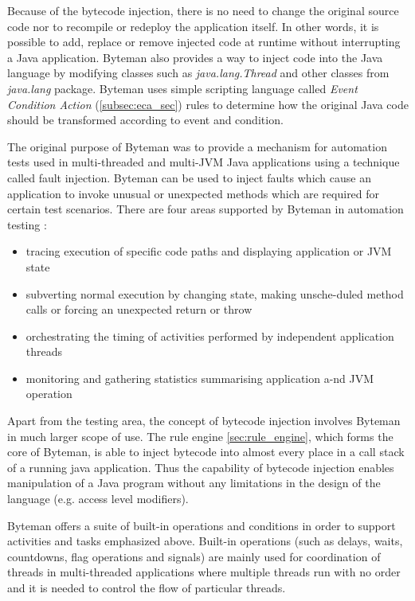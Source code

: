 \documentclass[12pt,oneside]{fithesis2}
\begin{document}
Because of the bytecode injection, there is no need to change the original source code nor to recompile or redeploy the application itself. In other words, it is possible to add, replace or remove injected code at runtime without interrupting a Java application. Byteman also provides a way to inject code into the Java language by modifying classes such as \textit{java.lang.Thread} and other classes from \textit{java.lang} package. Byteman uses simple scripting language called \textit{Event Condition Action} (\ref{subsec:eca_sec}) rules to determine how the original Java code should be transformed according to event and condition.

The original purpose of Byteman was to provide a mechanism for automation tests used in multi-threaded and multi-JVM Java applications using a technique called fault injection. Byteman can be used to inject faults which cause an application to invoke unusual or unexpected methods which are required for certain test scenarios. There are four areas supported by Byteman in automation testing \cite[Introduction to Byteman]{byteman_doc}:

\begin{itemize}
   \item tracing execution of specific code paths and displaying application or JVM state
   \item subverting normal execution by changing state, making unsche-duled method calls or forcing an unexpected return or throw
   \item orchestrating the timing of activities performed by independent application threads
   \item monitoring and gathering statistics summarising application a-nd JVM operation
\end{itemize}
Apart from the testing area, the concept of bytecode injection involves Byteman in much larger scope of use. The rule engine \ref{sec:rule_engine}, which forms the core of Byteman, is able to inject bytecode into almost every place in a call stack of a running java application. Thus the capability of bytecode injection enables manipulation of a Java program without any limitations in the design of the language (e.g. access level modifiers).

Byteman offers a suite of built-in operations and conditions in order to support activities and tasks emphasized above. Built-in operations (such as delays, waits, countdowns, flag operations and signals) are mainly used for coordination of threads in multi-threaded applications where multiple threads run with no order and it is needed to control the flow of particular threads.
\end{document}

